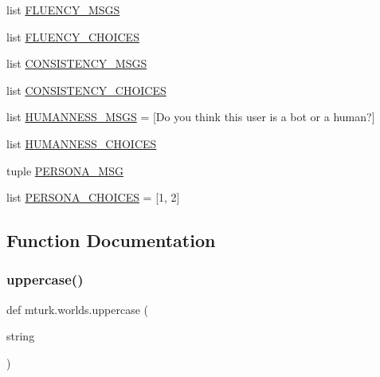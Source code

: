 \begin{DoxyCompactItemize}
\item 
list \hyperlink{namespacemturk_1_1worlds_a3dc44ca75f2a908d9625d7945ee2b111}{F\+L\+U\+E\+N\+C\+Y\+\_\+\+M\+S\+GS}
\item 
list \hyperlink{namespacemturk_1_1worlds_acfeb2fe7c200836d831a4eb5235ab0d6}{F\+L\+U\+E\+N\+C\+Y\+\_\+\+C\+H\+O\+I\+C\+ES}
\item 
list \hyperlink{namespacemturk_1_1worlds_a0a7f2bad20151d2c68bb1a2668cfd420}{C\+O\+N\+S\+I\+S\+T\+E\+N\+C\+Y\+\_\+\+M\+S\+GS}
\item 
list \hyperlink{namespacemturk_1_1worlds_a8c3b1162ca474cc812766e3e83d63879}{C\+O\+N\+S\+I\+S\+T\+E\+N\+C\+Y\+\_\+\+C\+H\+O\+I\+C\+ES}
\item 
list \hyperlink{namespacemturk_1_1worlds_afd25525fd61ca2074a13c9f151d32db7}{H\+U\+M\+A\+N\+N\+E\+S\+S\+\_\+\+M\+S\+GS} = \mbox{[}\textquotesingle{}Do you think this user is a bot or a human?\textquotesingle{}\mbox{]}
\item 
list \hyperlink{namespacemturk_1_1worlds_aeedbec4c9537e055ef52c6fb5b234715}{H\+U\+M\+A\+N\+N\+E\+S\+S\+\_\+\+C\+H\+O\+I\+C\+ES}
\item 
tuple \hyperlink{namespacemturk_1_1worlds_a85318fdca056e33e64773efa915bcdca}{P\+E\+R\+S\+O\+N\+A\+\_\+\+M\+SG}
\item 
list \hyperlink{namespacemturk_1_1worlds_a72f0223c5fde1f3788636255d2095bf3}{P\+E\+R\+S\+O\+N\+A\+\_\+\+C\+H\+O\+I\+C\+ES} = \mbox{[}\textquotesingle{}1\textquotesingle{}, \textquotesingle{}2\textquotesingle{}\mbox{]}
\end{DoxyCompactItemize}


\subsection{Function Documentation}
\mbox{\label{namespacemturk_1_1worlds_ab708bf300fdd999b3a3d6bde99cf03c8}} 
\subsubsection{\texorpdfstring{uppercase()}{uppercase()}}
{\footnotesize\ttfamily def mturk.\+worlds.\+uppercase (\begin{DoxyParamCaption}\item[{}]{string }\end{DoxyParamCaption})}



